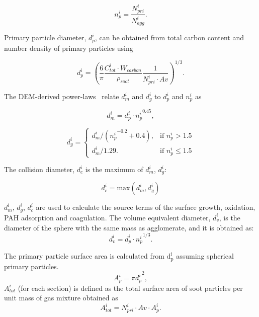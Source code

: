 \begin{equation}
	n^i_p = \frac{N^i_{pri}}{N^i_{agg}}
	\label{eqn:n_p}.
\end{equation}

Primary particle diameter, ${d^i_p}$, can be obtained from total carbon content and number density of primary particles using

\begin{equation}
	d^i_p = \left(\frac{6}{\pi} \frac{C^i_{tot}\cdot W_{carbon}}{\rho_{soot}} \frac{1}{N^i_{pri}\cdot Av} \right)^{1/3}
	\label{eqn:d_p}.
\end{equation}

The DEM-derived power-laws~\citep{Kelesidis2017} relate ${d^i_m}$ and ${d^i_g}$ to ${d^i_p}$ and ${n^i_p}$ as

\begin{equation}
	d^i_{m} = d^i_p\cdot {n^i_p}^{0.45}
	\label{eqn:d_m},
\end{equation}

\begin{equation}
	d^i_g = 
	\left\{
	\begin{array}{lr}
		d^i_m/({n^i_p}^{-0.2}+0.4), & \text{if } n^i_p > 1.5\\
		d^i_m/1.29. & \text{if } n^i_p\leq 1.5
	\end{array}
	\right.
	\label{eqn:d_g}
\end{equation}

The collision diameter, ${d^i_c}$ is the maximum of ${d^i_{m}}$, ${d^i_{g}}$:

\begin{equation}
	d^i_c = \mathrm{max}\left(d^i_m, d^i_g\right)
	\label{eqn:d_c}
\end{equation}

${d^i_{m}}$, ${d^i_{g}}$, ${d^i_{c}}$ are used to calculate the source terms of the surface growth, oxidation, PAH adsorption and coagulation. The volume equivalent diameter, $d^i_v$, is the diameter of the sphere with the same mass as agglomerate, and it is obtained as:
\begin{equation}
	d^i_v = d^i_p \cdot {n^i_p}^{1/3}
	\label{eqn:d_v}.
\end{equation}

The primary particle surface area is calculated from $\mathrm{d^i_p}$ assuming spherical primary particles.
\begin{equation}
	A^i_{p} = \pi {d^i_p}^2
	\label{eqn:Ap},
\end{equation}
$A^i_{tot}$ (for each section) is defined as the total surface area of soot particles per unit mass of gas mixture obtained as
\begin{equation}
	A^i_{tot} = N^i_{pri}\cdot Av\cdot A^i_{p}
	\label{eqn:Atot}.
\end{equation}

